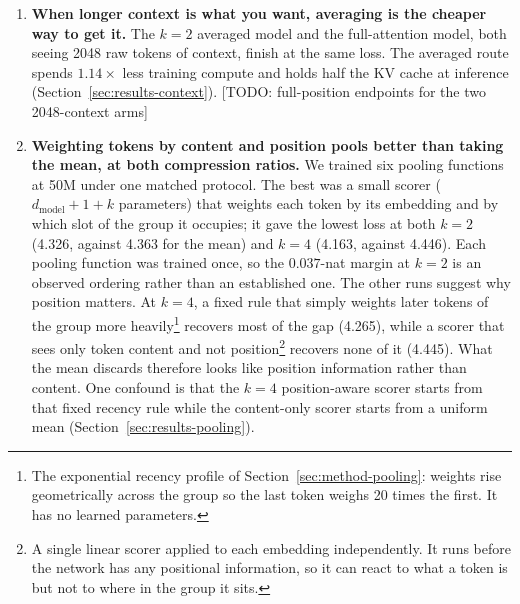 \documentclass[11pt]{article}
\newcommand{\todo}[1]{\textcolor{warnred}{[TODO: #1]}}
\newcommand{\dmodel}{d_{\mathrm{model}}}
\begin{document}
\begin{enumerate}
        attention window from 1024 to 2048 tokens costs $+0.214$ nats and
        $1.14\times$ the compute, and spending the averaging saving on
        longer context instead of more data is worse at both $k{=}2$ and
        $k{=}4$. On this data, then, what averaging buys is data per FLOP
        (Section~\ref{sec:results-context}).
  \item \textbf{When longer context is what you want, averaging is the
        cheaper way to get it.} The $k{=}2$ averaged model and the
        full-attention model, both seeing 2048 raw tokens of context, finish
        at the same loss. The averaged route spends $1.14\times$ less
        training compute and holds half the KV cache at inference
        (Section~\ref{sec:results-context}).
        \todo{full-position endpoints for the two 2048-context arms}
  \item \textbf{Weighting tokens by content and position pools better than
        taking the mean, at both compression ratios.} We trained six pooling
        functions at 50M under one matched protocol. The best was a small
        scorer ($\dmodel{+}1{+}k$ parameters) that weights each token by its
        embedding and by which slot of the group it occupies; it gave the
        lowest loss at both $k{=}2$ (4.326, against 4.363 for the mean) and
        $k{=}4$ (4.163, against 4.446). Each pooling function was trained
        once, so the $0.037$-nat margin at $k{=}2$ is an observed ordering
        rather than an established one. The other runs suggest why position
        matters. At $k{=}4$, a fixed rule that simply weights later tokens
        of the group more heavily\footnote{The exponential recency profile
        of Section~\ref{sec:method-pooling}: weights rise geometrically
        across the group so the last token weighs 20 times the first. It has
        no learned parameters.} recovers most of the gap (4.265), while a
        scorer that sees only token content and not position\footnote{A
        single linear scorer applied to each embedding independently. It
        runs before the network has any positional information, so it can
        react to what a token is but not to where in the group it sits.}
        recovers none of it (4.445). What the mean discards therefore looks
        like position information rather than content. One confound is that
        the $k{=}4$ position-aware scorer starts from that fixed recency
        rule while the content-only scorer starts from a uniform mean
        (Section~\ref{sec:results-pooling}).
\end{enumerate}
\end{document}
